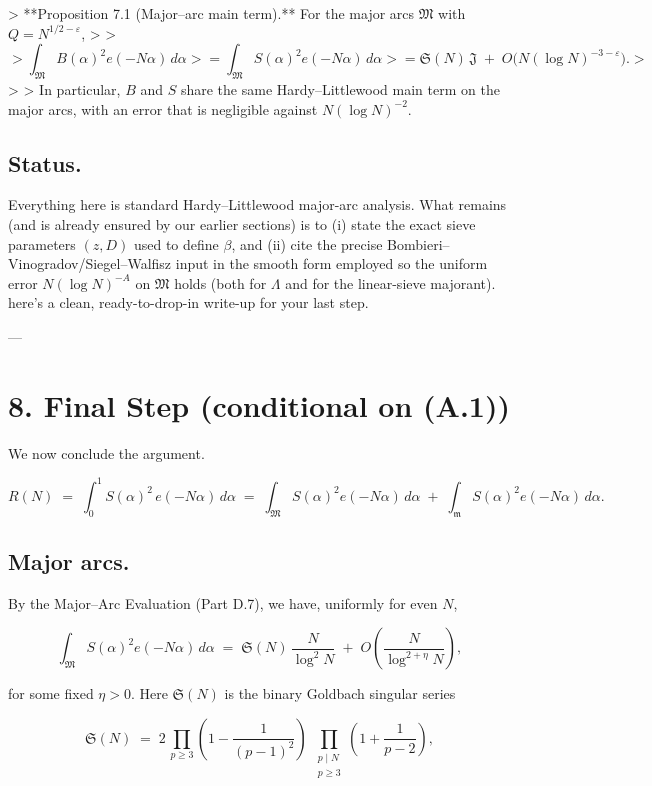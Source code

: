 \documentclass[11pt]{article}
\theoremstyle{definition}
\theoremstyle{remark}
\begin{document}
> **Proposition 7.1 (Major–arc main term).** For the major arcs $\mathfrak M$ with $Q=N^{1/2-\varepsilon}$,
>
> $$
> \int_{\mathfrak M} B(\alpha)^2 e(-N\alpha)\,d\alpha
> =\int_{\mathfrak M} S(\alpha)^2 e(-N\alpha)\,d\alpha
> =\mathfrak S(N)\,\mathfrak J\;+\;O\!\big(N(\log N)^{-3-\varepsilon}\big).
> $$
>
> In particular, $B$ and $S$ share the same Hardy–Littlewood main term on the major arcs, with an error that is negligible against $N(\log N)^{-2}$.

\subsection*{Status.} 
Everything here is standard Hardy–Littlewood major-arc analysis. What remains (and is already ensured by our earlier sections) is to (i) state the exact sieve parameters $(z,D)$ used to define $\beta$, and (ii) cite the precise Bombieri–Vinogradov/Siegel–Walfisz input in the smooth form employed so the uniform error $N(\log N)^{-A}$ on $\mathfrak M$ holds (both for $\Lambda$ and for the linear-sieve majorant).
here’s a clean, ready-to-drop-in write-up for your last step.

---

\section*{8. Final Step (conditional on (A.1))}

We now conclude the argument.

$$
R(N)\;=\;\int_0^1 S(\alpha)^2\,e(-N\alpha)\,d\alpha
\;=\;\int_{\mathfrak M} S(\alpha)^2 e(-N\alpha)\,d\alpha
\;+\;\int_{\mathfrak m} S(\alpha)^2 e(-N\alpha)\,d\alpha.
$$

\subsection*{Major arcs.}

By the Major–Arc Evaluation (Part D.7), we have, uniformly for even $N$,

$$
\int_{\mathfrak M} S(\alpha)^2 e(-N\alpha)\,d\alpha
\;=\;\mathfrak S(N)\,\frac{N}{\log^2 N}\;+\;O\!\left(\frac{N}{\log^{2+\eta}N}\right),
$$

for some fixed $\eta>0$. Here $\mathfrak S(N)$ is the binary Goldbach singular series

$$
\mathfrak S(N)
\;=\;2\,\prod_{p\ge 3}\!\left(1-\frac{1}{(p-1)^2}\right)
\;\prod_{\substack{p\mid N\\ p\ge 3}}\!\!\left(1+\frac{1}{p-2}\right),
$$
\end{document}

